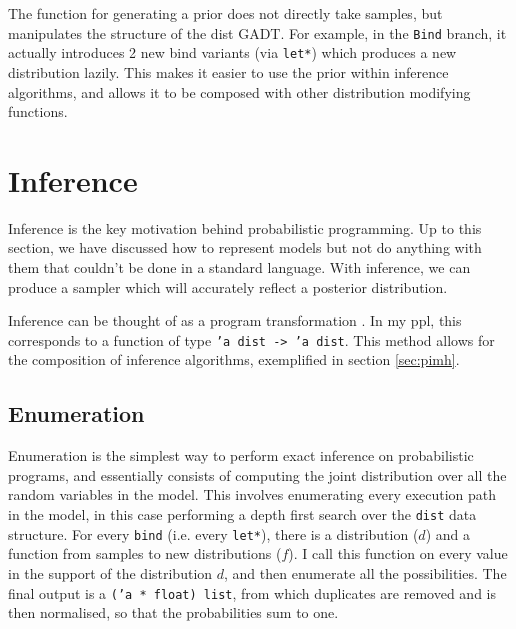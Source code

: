 
The function for generating a prior does not directly take samples, but manipulates the structure of the dist GADT. For example, in the \texttt{Bind} branch, it actually introduces 2 new bind variants (via \texttt{let*}) which produces a new distribution lazily. This makes it easier to use the prior within inference algorithms, and allows it to be composed with other distribution modifying functions.

\section{Inference} \label{sec:inference}

Inference is the key motivation behind probabilistic programming. Up to this section, we have discussed how to represent models but not do anything with them that couldn't be done in a standard language. With inference, we can produce a sampler which will accurately reflect a posterior distribution.

Inference can be thought of as a program transformation \cite{scibior2015practical} \cite{Zinkov2016ComposingIA}. In my ppl, this corresponds to a function of type \texttt{'a dist -> 'a dist}. This method allows for the composition of inference algorithms, exemplified in section \ref{sec:pimh}.

	
	
	
	
\subsection{Enumeration} \label{sec:enum}
Enumeration is the simplest way to perform exact inference on probabilistic programs, and essentially consists of computing the joint distribution over all the random variables in the model. This involves enumerating every execution path in the model, in this case performing a depth first search over the \texttt{dist} data structure. For every \texttt{bind} (i.e. every \texttt{let*}), there is a distribution ($d$) and a function from samples to new distributions ($f$). I call this function on every value in the support of the distribution $d$, and then enumerate all the possibilities. The final output is a \texttt{('a * float) list}, from which duplicates are removed and is then normalised, so that the probabilities sum to one.
	
